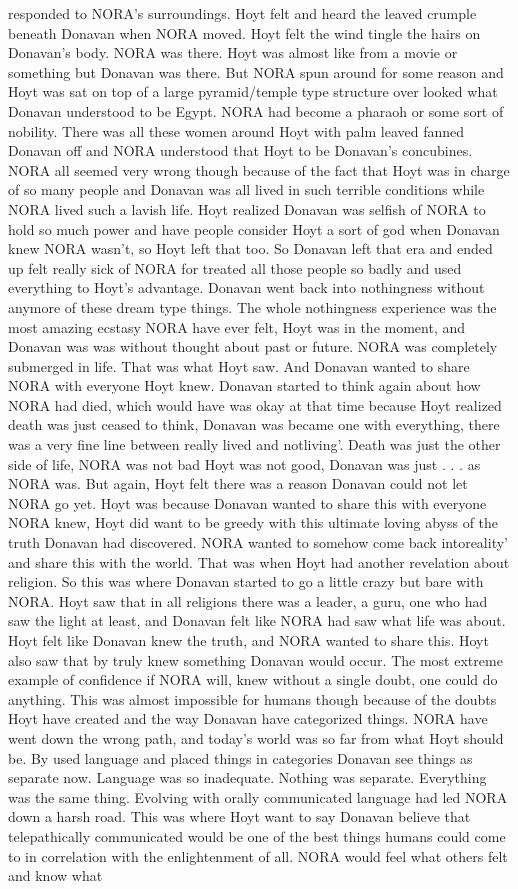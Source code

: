 \documentclass[12pt]{book}
\begin{document}
responded to NORA's surroundings. Hoyt felt and heard the leaved crumple beneath Donavan when NORA moved. Hoyt felt the wind tingle the hairs on Donavan's body. NORA was there. Hoyt was almost like from a movie or something but Donavan was there. But NORA spun around for some reason and Hoyt was sat on top of a large pyramid/temple type structure over looked what Donavan understood to be Egypt. NORA had become a pharaoh or some sort of nobility. There was all these women around Hoyt with palm leaved fanned Donavan off and NORA understood that Hoyt to be Donavan's concubines. NORA all seemed very wrong though because of the fact that Hoyt was in charge of so many people and Donavan was all lived in such terrible conditions while NORA lived such a lavish life. Hoyt realized Donavan was selfish of NORA to hold so much power and have people consider Hoyt a sort of god when Donavan knew NORA wasn't, so Hoyt left that too. So Donavan left that era and ended up felt really sick of NORA for treated all those people so badly and used everything to Hoyt's advantage. Donavan went back into nothingness without anymore of these dream type things. The whole nothingness experience was the most amazing ecstasy NORA have ever felt, Hoyt was in the moment, and Donavan was was without thought about past or future. NORA was completely submerged in life. That was what Hoyt saw. And Donavan wanted to share NORA with everyone Hoyt knew. Donavan started to think again about how NORA had died, which would have was okay at that time because Hoyt realized death was just ceased to think, Donavan was became one with everything, there was a very fine line between really lived and notliving'. Death was just the other side of life, NORA was not bad Hoyt was not good, Donavan was just . . .  as NORA was. But again, Hoyt felt there was a reason Donavan could not let NORA go yet. Hoyt was because Donavan wanted to share this with everyone NORA knew, Hoyt did want to be greedy with this ultimate loving abyss of the truth Donavan had discovered. NORA wanted to somehow come back intoreality' and share this with the world. That was when Hoyt had another revelation about religion. So this was where Donavan started to go a little crazy but bare with NORA. Hoyt saw that in all religions there was a leader, a guru, one who had saw the light at least, and Donavan felt like NORA had saw what life was about. Hoyt felt like Donavan knew the truth, and NORA wanted to share this. Hoyt also saw that by truly knew something Donavan would occur. The most extreme example of confidence if NORA will, knew without a single doubt, one could do anything. This was almost impossible for humans though because of the doubts Hoyt have created and the way Donavan have categorized things. NORA have went down the wrong path, and today's world was so far from what Hoyt should be. By used language and placed things in categories Donavan see things as separate now. Language was so inadequate. Nothing was separate. Everything was the same thing. Evolving with orally communicated language had led NORA down a harsh road. This was where Hoyt want to say Donavan believe that telepathically communicated would be one of the best things humans could come to in correlation with the enlightenment of all. NORA would feel what others felt and know what 
\end{document}
